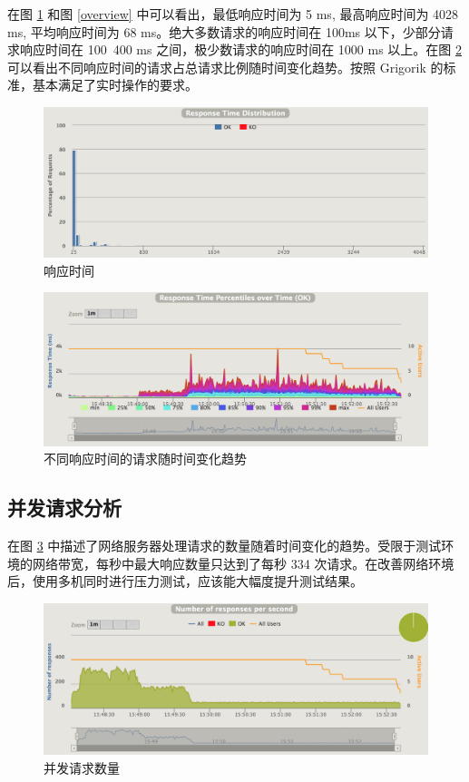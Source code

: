 在图 \ref{response} 和图 \ref{overview} 中可以看出，最低响应时间为 5 ms, 最高响应时间为 4028 ms, 平均响应时间为 68 ms。绝大多数请求的响应时间在 100ms 以下，少部分请求响应时间在 100~400 ms 之间，极少数请求的响应时间在 1000 ms 以上。在图 \ref{overtime} 可以看出不同响应时间的请求占总请求比例随时间变化趋势。按照 Grigorik 的标准，基本满足了实时操作的要求。

\begin{figure}
\centering
\includegraphics[width=148mm]{images/response}
\caption{响应时间}
\label{response}
\end{figure}

\begin{figure}
\centering
\includegraphics[width=148mm]{images/overtime}
\caption{不同响应时间的请求随时间变化趋势}
\label{overtime}
\end{figure}

\subsection{并发请求分析}
在图 \ref{request} 中描述了网络服务器处理请求的数量随着时间变化的趋势。受限于测试环境的网络带宽，每秒中最大响应数量只达到了每秒 334 次请求。在改善网络环境后，使用多机同时进行压力测试，应该能大幅度提升测试结果。

\begin{figure}
\centering
\includegraphics[width=148mm]{images/request}
\caption{并发请求数量}
\label{request}
\end{figure}

